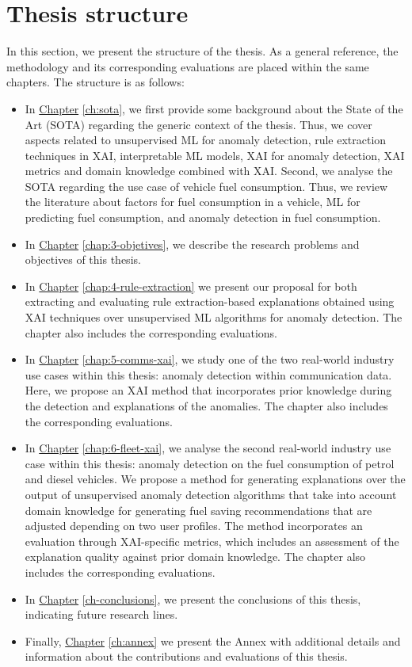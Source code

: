 \section{Thesis structure}\label{sec:ch1-thesis-structure}
In this section, we present the structure of the thesis. As a general reference, the methodology and its corresponding evaluations are placed within the same chapters. The structure is as follows:

\begin{itemize}
\item In \hyperref[ch:sota]{Chapter} \ref{ch:sota}, we first provide some background about the State of the Art (SOTA) regarding the generic context of the thesis. Thus, we cover aspects related to unsupervised ML for anomaly detection, rule extraction techniques in XAI, interpretable ML models, XAI for anomaly detection, XAI metrics and domain knowledge combined with XAI. Second, we analyse the SOTA regarding the use case of vehicle fuel consumption. Thus, we review the literature about factors for fuel consumption in a vehicle, ML for predicting fuel consumption, and anomaly detection in fuel consumption.
\item In \hyperref[chap:3-objetives]{Chapter} \ref{chap:3-objetives}, we describe the research problems and objectives of this thesis.
\item In \hyperref[chap:4-rule-extraction]{Chapter} \ref{chap:4-rule-extraction} we present our proposal for both extracting and evaluating rule extraction-based explanations obtained using XAI techniques over unsupervised ML algorithms for anomaly detection. The chapter also includes the corresponding evaluations.
\item In \hyperref[chap:5-comms-xai]{Chapter} \ref{chap:5-comms-xai}, we study one of the two real-world industry use cases within this thesis: anomaly detection within communication data. Here, we propose an XAI method that incorporates prior knowledge during the detection and explanations of the anomalies. The chapter also includes the corresponding evaluations.
\item In \hyperref[chap:6-fleet-xai]{Chapter} \ref{chap:6-fleet-xai}, we analyse the second real-world industry use case within this thesis: anomaly detection on the fuel consumption of petrol and diesel vehicles. We propose a method for generating explanations over the output of unsupervised anomaly detection algorithms that take into account domain knowledge for generating fuel saving recommendations that are adjusted depending on two user profiles. The method incorporates an evaluation through XAI-specific metrics, which includes an assessment of the explanation quality against prior domain knowledge. The chapter also includes the corresponding evaluations.
\item In \hyperref[ch-conclusions]{Chapter} \ref{ch-conclusions}, we present the conclusions of this thesis, indicating future research lines.
\item Finally, \hyperref[ch:annex]{Chapter} \ref{ch:annex} we present the Annex with additional details and information about the contributions and evaluations of this thesis.
\end{itemize}

